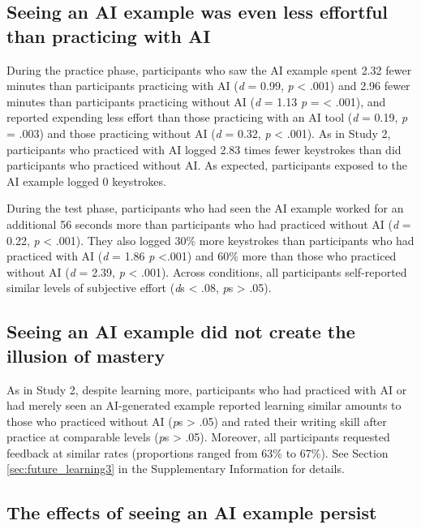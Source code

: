 \documentclass[11pt]{report}
\begin{document}
\begin{mainf}
\subsection{Seeing an AI example was even less effortful than practicing
with
AI}\label{seeing-an-ai-example-was-even-less-effortful-than-practicing-with-ai}

During the practice phase, participants who saw the AI example spent 2.32 fewer minutes than participants
practicing with AI (\emph{d} = 0.99, \emph{p} \textless{}
.001) and 2.96 fewer minutes than participants practicing without AI (\emph{d} =
1.13 \emph{p} = \textless{} .001), and reported expending less effort than those practicing with an AI tool
(\emph{d} = 0.19, \emph{p} = .003) and those practicing without AI (\emph{d} = 0.32, \emph{p}
\textless{} .001).  As in Study 2, participants who practiced with AI logged 2.83 times fewer keystrokes than did participants who practiced without AI. As expected, participants exposed to the AI example logged 0 keystrokes.

During the test phase, participants who had seen the AI example worked for an additional 56 seconds more than participants who had practiced without AI (\emph{d} = 0.22, \emph{p} \textless{} .001). They also logged 30\% more keystrokes than participants who had practiced with AI (\textit{d} = 1.86 \textit{p} <.001) and 60\% more than those who practiced without AI (\textit{d} = 2.39, \textit{p} < .001). Across conditions, all participants self-reported similar levels of subjective effort (\textit{d}s < .08, \textit{p}s > .05).

\subsection{Seeing an AI example did not create the illusion of mastery}

As in Study 2, despite learning more, participants who had practiced with AI or had merely seen an AI-generated example reported learning similar amounts to those who practiced without AI (\textit{p}s > .05) and rated their writing skill after practice at comparable levels (\textit{p}s > .05). Moreover, all participants requested feedback at similar rates (proportions ranged from 63\% to 67\%). See Section \ref{sec:future_learning3} in the Supplementary Information for details.


\subsection{The effects of seeing an AI example
persist}\label{the-effects-of-seeing-an-ai-example-persist}


\end{mainf}
\end{document}

